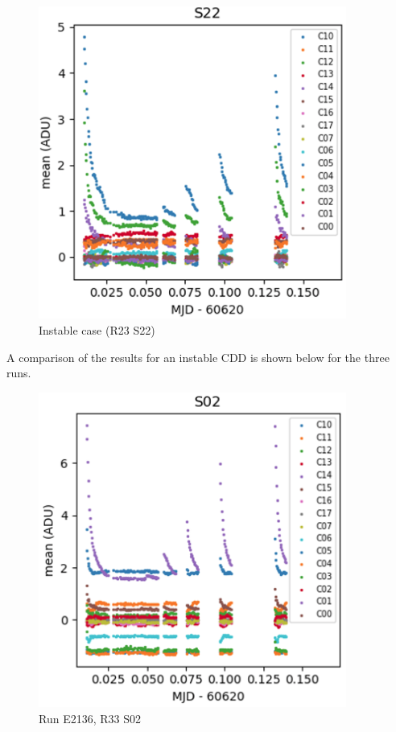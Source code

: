 \begin{figure}
\begin{centering}
\includegraphics[width=0.9\textwidth]{sections/figures/E2136_R23_S22.png}
\end{centering}
\caption{Instable case (R23 S22)}
\end{figure}

A comparison of the results for an instable CDD is shown below for the
three runs.

\begin{figure}
\begin{centering}
\includegraphics[width=0.9\textwidth]{sections/figures/E2136_R33_S02.png}
\end{centering}
\caption{Run E2136, R33 S02}
\end{figure}

